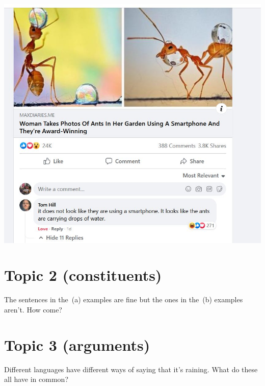 \documentclass{article}
\begin{document}
\begin{center}
\includegraphics[width=0.8\linewidth, alt={Screenshot of a Facebook post. A user posted a story with two close-up photos of ants carrying drops of water. The headline is: ``Woman Takes Photos Of Ants In Her GArden Using A Smartphone And They're Award-Winning''. A comment reads: ``it does not look like they are using a smartphone. It looks like the ants are carrying drops of water.'', accompanied by many `laugh', `like' and `love' reactions.}]{Images/award-winning-ants.jpg}
\end{center}

\section{Topic 2 (constituents)}
The sentences in the~(a) examples are fine but the ones in the~(b) examples aren't. How come?

\ea \label{ex:top2a}
      \label{ex:2aok}
     \label{ex:2abad}
    \z
\ex \label{ex:top2b}
      \label{ex:2bok}
     \label{ex:2bbad}
    \z
\z

\section{Topic 3 (arguments)}
Different languages have different ways of saying that it's raining. What do these all have in common?
\end{document}
